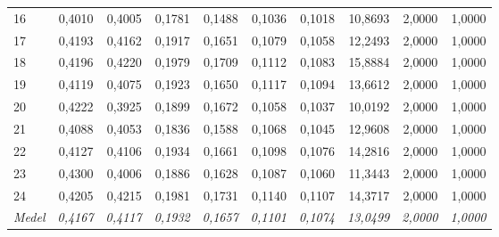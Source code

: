 \begin{table}[H]
{\begin{tabular}{lrrrrrrrrr}
16 & 0{,}4010 & 0{,}4005 & 0{,}1781 & 0{,}1488 & 0{,}1036 & 0{,}1018 & 10{,}8693 & 2{,}0000 & 1{,}0000 \\
17 & 0{,}4193 & 0{,}4162 & 0{,}1917 & 0{,}1651 & 0{,}1079 & 0{,}1058 & 12{,}2493 & 2{,}0000 & 1{,}0000 \\
18 & 0{,}4196 & 0{,}4220 & 0{,}1979 & 0{,}1709 & 0{,}1112 & 0{,}1083 & 15{,}8884 & 2{,}0000 & 1{,}0000 \\
19 & 0{,}4119 & 0{,}4075 & 0{,}1923 & 0{,}1650 & 0{,}1117 & 0{,}1094 & 13{,}6612 & 2{,}0000 & 1{,}0000 \\
20 & 0{,}4222 & 0{,}3925 & 0{,}1899 & 0{,}1672 & 0{,}1058 & 0{,}1037 & 10{,}0192 & 2{,}0000 & 1{,}0000 \\
21 & 0{,}4088 & 0{,}4053 & 0{,}1836 & 0{,}1588 & 0{,}1068 & 0{,}1045 & 12{,}9608 & 2{,}0000 & 1{,}0000 \\
22 & 0{,}4127 & 0{,}4106 & 0{,}1934 & 0{,}1661 & 0{,}1098 & 0{,}1076 & 14{,}2816 & 2{,}0000 & 1{,}0000 \\
23 & 0{,}4300 & 0{,}4006 & 0{,}1886 & 0{,}1628 & 0{,}1087 & 0{,}1060 & 11{,}3443 & 2{,}0000 & 1{,}0000 \\
24 & 0{,}4205 & 0{,}4215 & 0{,}1981 & 0{,}1731 & 0{,}1140 & 0{,}1107 & 14{,}3717 & 2{,}0000 & 1{,}0000 \\
\hline
\textit{Medel} & \textit{0{,}4167} & \textit{0{,}4117} & \textit{0{,}1932} & \textit{0{,}1657} & \textit{0{,}1101} & \textit{0{,}1074} & \textit{13{,}0499} & \textit{2{,}0000} & \textit{1{,}0000} \\
\hline
\end{tabular}
}
\end{table}

